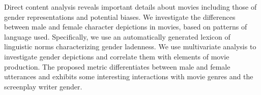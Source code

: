 Direct content analysis reveals important details about movies including those of gender representations and potential biases. We investigate the differences between male and female character depictions in movies, based on patterns of language used. Specifically, we use an automatically generated lexicon of linguistic norms characterizing gender ladenness. We use multivariate analysis to investigate gender depictions and correlate them with elements of movie production. The proposed metric differentiates between male and female utterances and exhibits some interesting interactions with movie genres and the screenplay writer gender.
